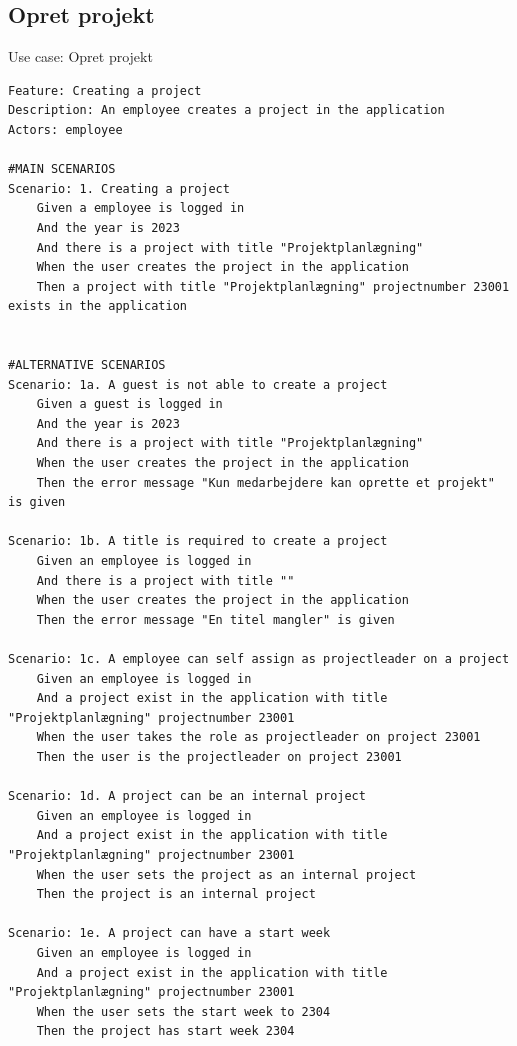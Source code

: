 \subsection{Opret projekt} 
\begin{listing}[H]
    \centering
    \caption{Use case: Opret projekt}\label{lst:usecase_create_project}
    \begin{verbatim}  
Feature: Creating a project
Description: An employee creates a project in the application
Actors: employee

#MAIN SCENARIOS
Scenario: 1. Creating a project
    Given a employee is logged in
    And the year is 2023
    And there is a project with title "Projektplanlægning" 
    When the user creates the project in the application 
    Then a project with title "Projektplanlægning" projectnumber 23001 exists in the application


#ALTERNATIVE SCENARIOS
Scenario: 1a. A guest is not able to create a project
    Given a guest is logged in
    And the year is 2023
    And there is a project with title "Projektplanlægning"  
    When the user creates the project in the application 
    Then the error message "Kun medarbejdere kan oprette et projekt" is given

Scenario: 1b. A title is required to create a project
    Given an employee is logged in
    And there is a project with title ""  
    When the user creates the project in the application 
    Then the error message "En titel mangler" is given

Scenario: 1c. A employee can self assign as projectleader on a project
    Given an employee is logged in
    And a project exist in the application with title "Projektplanlægning" projectnumber 23001
    When the user takes the role as projectleader on project 23001
    Then the user is the projectleader on project 23001

Scenario: 1d. A project can be an internal project
    Given an employee is logged in
    And a project exist in the application with title "Projektplanlægning" projectnumber 23001
    When the user sets the project as an internal project
    Then the project is an internal project

Scenario: 1e. A project can have a start week
    Given an employee is logged in
    And a project exist in the application with title "Projektplanlægning" projectnumber 23001
    When the user sets the start week to 2304
    Then the project has start week 2304
    
    \end{verbatim}
\end{listing}


